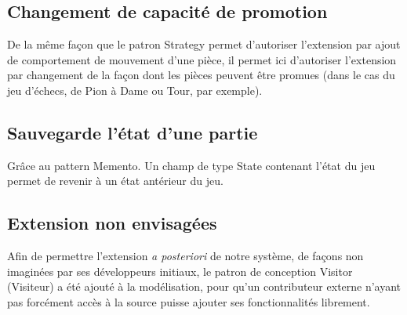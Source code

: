 \documentclass[11pt]{article}
\begin{document}
\subsection{Changement de capacité de promotion}
\label{sec-4-3}
De la même façon que le patron Strategy permet d'autoriser l'extension par ajout de comportement de mouvement d'une pièce, il permet ici d'autoriser l'extension par changement de la façon dont les pièces peuvent être promues (dans le cas du jeu d'échecs, de Pion à Dame ou Tour, par exemple).
\subsection{Sauvegarde l'état d'une partie}
\label{sec-4-4}

   Grâce au pattern Memento.
   Un champ de type State contenant l'état du jeu permet de revenir à un état antérieur du jeu.

\subsection{Extension non envisagées}
\label{sec-4-5}
Afin de permettre l'extension \emph{a posteriori} de notre système, de façons non imaginées par ses développeurs initiaux, le patron de conception Visitor (Visiteur) a été ajouté à la modélisation, pour qu'un contributeur externe n'ayant pas forcément accès à la source puisse ajouter ses fonctionnalités librement.
\end{document}
